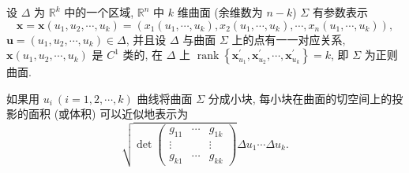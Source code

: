 \begin{definition}\label{def:11.1.4}
设 $\Delta$ 为 $\mathbb{R}^{k}$ 中的一个区域, $\mathbb{R}^{n}$ 中 $k$ 维曲面 (余维数为 $n-k$) $\Sigma$ 有参数表示
\[
  \boldsymbol{x}=\boldsymbol{x}\left(u_{1}, u_{2}, \cdots, u_{k}\right)=\left(x_{1}\left(u_{1}, \cdots, u_{k}\right), x_{2}\left(u_{1}, \cdots, u_{k}\right), \cdots, x_{n}\left(u_{1}, \cdots, u_{k}\right)\right),
\]
$\boldsymbol{u}=\left(u_{1}, u_{2}, \cdots, u_{k}\right) \in \Delta$, 并且设 $\Delta$ 与曲面 $\Sigma$ 上的点有一一对应关系, $\boldsymbol{x}\left(u_{1}, u_{2}, \cdots, u_{k}\right)$ 是 $C^{1}$ 类的, 在 $\Delta$ 上 $\operatorname{rank}\left\{\boldsymbol{x}_{u_{1}}^{\prime}, \boldsymbol{x}_{u_{2}}^{\prime}, \cdots, \boldsymbol{x}_{u_{k}}^{\prime}\right\}=k$, 即 $\Sigma$ 为正则曲面.

如果用 $u_{i}\ (i=1,2, \cdots, k)$ 曲线将曲面 $\Sigma$ 分成小块, 每小块在曲面的切空间上的投影的面积 (或体积) 可以近似地表示为
\[
  \sqrt{\operatorname{det}\begin{pmatrix}
    g_{11} & \cdots & g_{1 k} \\
    \vdots & & \vdots \\
    g_{k 1} & \cdots & g_{k k}
  \end{pmatrix}} \Delta u_{1} \cdots \Delta u_{k}.
\]


\end{definition}
